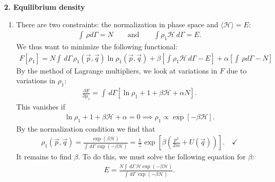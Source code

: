 \documentclass{article}
\theoremstyle{definition}
\newcommand{\p}{\partial}
\newcommand{\ham}{\mathcal{H}}
\newcommand{\al}{\alpha}
\newcommand{\be}{\beta}
\newcommand{\f}[2]{\frac{#1}{#2}}
\newcommand{\lp}{\left(}
\newcommand{\rp}{\right)}
\newcommand{\lb}{\left[}
\newcommand{\rb}{\right]}
\begin{document}
\noindent \textbf{2. Equilibrium density}

\begin{enumerate}[label=(\alph*)]
	\item There are two constraints: the normalization in phase space and $\langle \ham \rangle = E$:
	\begin{align*}
	\int \,\rho d\Gamma = N \quad\quad \text{and} \quad\quad \int \rho_1 \ham \,d\Gamma = E.  
	\end{align*}
	We thus want to minimize the following functional:
	\begin{align*}
	F[\rho_1] = N \int \, d\Gamma\,\rho_1(\vec{p},\vec{q}) \ln \rho_1 (\vec{p},\vec{q}) + \be \lb \int \rho_1 \ham \,d\Gamma - E\rb  + \al\lb \int \,\rho d\Gamma -  N  \rb  
	\end{align*}
	By the method of Lagrange multipliers, we look at variations in $F$ due to variations in $\rho_1$:
	\begin{align*}
	\f{\p F}{\p \rho_1} =  \int \,d\Gamma \lb \ln \rho_1 + 1 + \be \ham + \al N  \rb.
	\end{align*}
	This vanishes if 
	\begin{align*}
	\ln \rho_1 + 1 + \be \ham + \al = 0 \implies \rho_1 \propto \exp\lb -\be \ham \rb.
	\end{align*}
	By the normalization condition we find that 
	\begin{align*}
	\rho_1(\vec{p},\vec{q}) 
	= \f{\exp(\be \ham)}{\int \, d\Gamma\, \exp(-\be\ham)} 
	= \f{1}{\mathcal{Z}} \exp\lb \be \lp \f{p^2}{2m} + U(\vec{q}) \rp \rb. \quad\checkmark
	\end{align*}
	It remains to find $\be$. To do this, we must solve the following equation for $\be$:
	\begin{align*}
	E = \f{N \int \,d\Gamma \, \ham \exp(-\be \ham)}{\int \, d\Gamma\, \exp(-\be\ham)}.
	\end{align*}
	

\end{enumerate}
\end{document}

